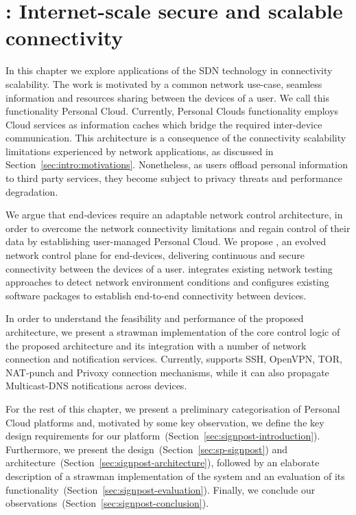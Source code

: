 \chapter{\signpost: Internet-scale secure and scalable connectivity}
\label{sec:signpost}
\ifpdf
    \graphicspath{{Chapter3/Chapter3Figs/PNG/}{Chapter3/Chapter3Figs/PDF/}{Chapter3/Chapter3Figs/}}
\else
    \graphicspath{{Chapter3/Chapter3Figs/EPS/}{Chapter3/Chapter3Figs/}}
\fi

In this chapter we explore applications of the SDN technology in connectivity
scalability.  The work is motivated by a common network use-case, seamless
information and resources sharing between the devices of a user.  We call this
functionality Personal Cloud.  Currently, Personal Clouds functionality employs
Cloud services as information caches which bridge the required inter-device
communication. This architecture is a consequence of the connectivity
scalability limitations experienced by network applications, as discussed in
Section~\ref{sec:intro:motivations}. Nonetheless, as users offload personal
information to third party services, they become subject to privacy threats and
performance degradation.

We argue that end-devices require an adaptable network control architecture, in
order to overcome the network connectivity limitations and regain control of
their data by establishing user-managed Personal Cloud.  We propose \signpost,
an evolved network control plane for end-devices, delivering continuous and
secure connectivity between the devices of a user. \signpost integrates existing
network testing approaches to detect network environment conditions and
configures existing software packages to establish end-to-end connectivity
between devices. 

In order to understand the feasibility and performance of the proposed
architecture, we present a strawman implementation of the core control logic of
the proposed architecture and its integration with a number of network
connection and notification services.  Currently, \signpost supports SSH,
OpenVPN, TOR, NAT-punch and Privoxy connection mechanisms, while it can also
propagate Multicast-DNS notifications across devices.

For the rest of this chapter, we present a preliminary categorisation of
Personal Cloud platforms and,
motivated by some key observation, we define the key design requirements for our
platform~(Section~\ref{sec:signpost-introduction}). Furthermore, we present the
\signpost design~(Section~\ref{sec:sp-signpost}) and  
architecture~(Section~\ref{sec:signpost-architecture}), followed by an elaborate
description of a strawman implementation of the system and an evaluation of its
functionality~(Section~\ref{sec:signpost-evaluation}).  Finally, we conclude our
observations~(Section~\ref{sec:signpost-conclusion}).

